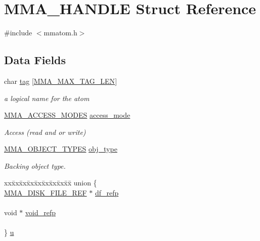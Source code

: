 \hypertarget{struct_m_m_a___h_a_n_d_l_e}{\section{M\-M\-A\-\_\-\-H\-A\-N\-D\-L\-E Struct Reference}
\label{struct_m_m_a___h_a_n_d_l_e}
}


{\ttfamily \#include $<$mmatom.\-h$>$}

\subsection*{Data Fields}
\begin{DoxyCompactItemize}
\item 
char \hyperlink{struct_m_m_a___h_a_n_d_l_e_a83833ee55452b10d5fa6c7daa0295cd0}{tag} \mbox{[}\hyperlink{mmatom_8h_a61bdbcb1c787bc366cc82c35a5aecd75}{M\-M\-A\-\_\-\-M\-A\-X\-\_\-\-T\-A\-G\-\_\-\-L\-E\-N}\mbox{]}
\begin{DoxyCompactList}\small\item\em a logical name for the atom \end{DoxyCompactList}\item 
\hyperlink{mmatom_8h_accd6d884f022e3962f0b0544cfbc9720}{M\-M\-A\-\_\-\-A\-C\-C\-E\-S\-S\-\_\-\-M\-O\-D\-E\-S} \hyperlink{struct_m_m_a___h_a_n_d_l_e_a98aa4874a71c2ed9fb7dda0b285507b8}{access\-\_\-mode}
\begin{DoxyCompactList}\small\item\em Access (read and or write) \end{DoxyCompactList}\item 
\hyperlink{mmatom_8h_aa159a898b228728f9dc4f832308750c1}{M\-M\-A\-\_\-\-O\-B\-J\-E\-C\-T\-\_\-\-T\-Y\-P\-E\-S} \hyperlink{struct_m_m_a___h_a_n_d_l_e_a26e09b58edb668f1bafef07fd59ed8d1}{obj\-\_\-type}
\begin{DoxyCompactList}\small\item\em Backing object type. \end{DoxyCompactList}\item 
\begin{tabbing}
xx\=xx\=xx\=xx\=xx\=xx\=xx\=xx\=xx\=\kill
union \{\\
\>\hyperlink{struct_m_m_a___d_i_s_k___f_i_l_e___r_e_f}{MMA\_DISK\_FILE\_REF} $\ast$ \hyperlink{struct_m_m_a___h_a_n_d_l_e_a32aee81eaefaf0b164da0b9375fc4f2d}{df\_refp}\\
\>\\
\>void $\ast$ \hyperlink{struct_m_m_a___h_a_n_d_l_e_afa66c4821cc82b1e7f2ea0bbf3d6da7c}{void\_refp}\\
\>\\
\} \hyperlink{struct_m_m_a___h_a_n_d_l_e_a21169edfbd2efc332a0f67d74f5cd29b}{u}\\


\end{tabbing}
\end{DoxyCompactItemize}
